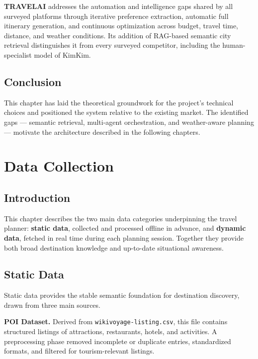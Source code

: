 \documentclass[12pt,a4paper]{report}
\begin{document}
\textbf{TRAVELAI} addresses the automation and intelligence gaps shared by all surveyed platforms
through iterative preference extraction, automatic full itinerary generation, and continuous
optimization across budget, travel time, distance, and weather conditions. Its addition of
RAG-based semantic city retrieval distinguishes it from every surveyed competitor, including the
human-specialist model of KimKim.

\section*{Conclusion}

This chapter has laid the theoretical groundwork for the project's technical choices and positioned
the system relative to the existing market. The identified gaps --- semantic retrieval, multi-agent
orchestration, and weather-aware planning --- motivate the architecture described in the
following chapters.
\chapter{Data Collection}

\section*{Introduction}

This chapter describes the two main data categories underpinning the travel planner: \textbf{static
data}, collected and processed offline in advance, and \textbf{dynamic data}, fetched in real time
during each planning session. Together they provide both broad destination knowledge and up-to-date
situational awareness.

\section{Static Data}

Static data provides the stable semantic foundation for destination discovery, drawn from three
main sources.

\textbf{POI Dataset.} Derived from \texttt{wikivoyage-listing.csv}, this file contains structured
listings of attractions, restaurants, hotels, and activities. A preprocessing phase removed
incomplete or duplicate entries, standardized formats, and filtered for tourism-relevant listings.
\end{document}
